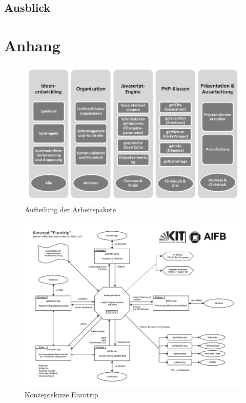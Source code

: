 \documentclass[a4paper, 11pt]{article}
\begin{document}
\subsection{Ausblick}
\newpage
\setcounter{page}{2}
\section{Anhang}
\begin{figure}[H]
	\centering
	\includegraphics[width=1.0\columnwidth, angle=0]{projektplanung_organigramm_sw.png}
	\caption{Aufteilung der Arbeitspakete}
	\label{pic:Pakete}
\end{figure}
\begin{figure}
	\centering\includegraphics[scale=0.2]{seminarLOD.png}
	\caption{Konzeptskizze Eurotrip}
	\label{pic:Konzept}
\end{figure}
\end{document}
